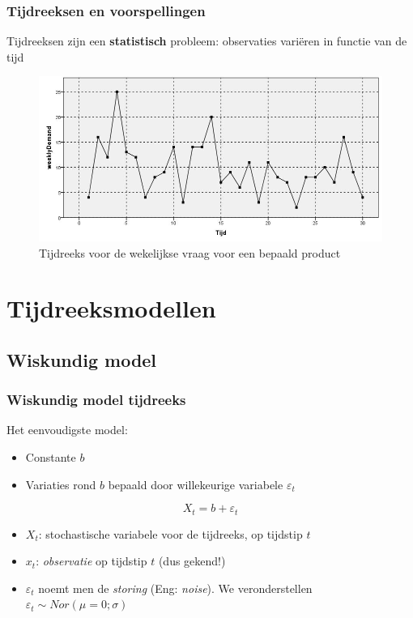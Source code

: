 \documentclass[aspectratio=169]{beamer}
\begin{document}
\begin{frame}
  \frametitle{Tijdreeksen en voorspellingen}

  Tijdreeksen zijn een \textbf{statistisch} probleem: observaties variëren in functie van de tijd

  \begin{figure}
    \centering
    \includegraphics[width=\textwidth]{img/tijdreeks11}
    \caption{Tijdreeks voor de wekelijkse vraag voor een bepaald product}
  \end{figure}
\end{frame}

\section{Tijdreeksmodellen}

\subsection{Wiskundig model}

\begin{frame}
  \frametitle{Wiskundig model tijdreeks}

  Het eenvoudigste model:

  \begin{itemize}
    \item Constante $b$
    \item Variaties rond $b$ bepaald door willekeurige variabele $\varepsilon_{t}$
  \end{itemize}

  \begin{equation}
    X_{t} = b + \varepsilon_{t}
    \label{eq:tijdreeks-constante}
  \end{equation}

  \begin{itemize}
    \item $X_{t}$: stochastische variabele voor de tijdreeks, op tijdstip $t$
    \item $x_{t}$: \emph{observatie} op tijdstip $t$ (dus gekend!)
    \item $\varepsilon_{t}$ noemt men de \emph{storing} (Eng: \emph{noise}). We veronderstellen $\varepsilon_{t} \sim Nor(\mu = 0; \sigma)$
  \end{itemize}
\end{frame}
\end{document}

